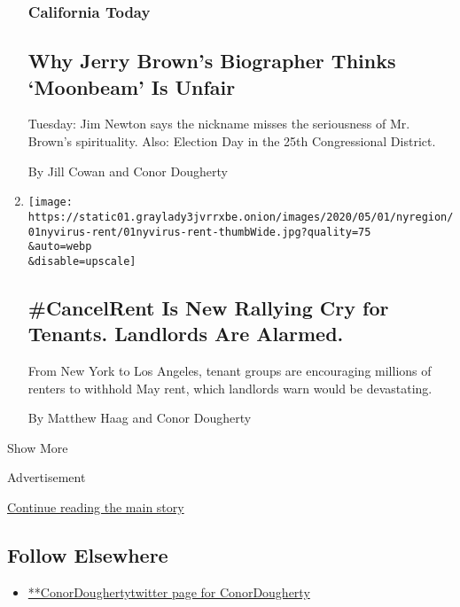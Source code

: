 \begin{enumerate}
  \hypertarget{california-today}{%
  \subsubsection{California Today}\label{california-today}}

  \hypertarget{why-jerry-browns-biographer-thinks-moonbeam-is-unfair}{%
  \subsection{Why Jerry Brown's Biographer Thinks `Moonbeam' Is
  Unfair}\label{why-jerry-browns-biographer-thinks-moonbeam-is-unfair}}

  Tuesday: Jim Newton says the nickname misses the seriousness of Mr.
  Brown's spirituality. Also: Election Day in the 25th Congressional
  District.

  By Jill Cowan and Conor Dougherty
\item
  \href{/2020/05/01/nyregion/rent-strike-coronavirus.html}{}

  \texttt{[image: https://static01.graylady3jvrrxbe.onion/images/2020/05/01/nyregion/01nyvirus-rent/01nyvirus-rent-thumbWide.jpg?quality=75\\\&auto=webp\\\&disable=upscale]}

  \hypertarget{cancelrent-is-new-rallying-cry-for-tenants-landlords-are-alarmed}{%
  \subsection{\#CancelRent Is New Rallying Cry for Tenants. Landlords
  Are
  Alarmed.}\label{cancelrent-is-new-rallying-cry-for-tenants-landlords-are-alarmed}}

  From New York to Los Angeles, tenant groups are encouraging millions
  of renters to withhold May rent, which landlords warn would be
  devastating.

  By Matthew Haag and Conor Dougherty
\end{enumerate}

Show More

Advertisement

\protect\hyperlink{after-mid2}{Continue reading the main story}

\hypertarget{follow-elsewhere}{%
\subsection{Follow Elsewhere}\label{follow-elsewhere}}

\begin{itemize}
\tightlist
\item
  \href{https://twitter.com/ConorDougherty}{**ConorDoughertytwitter page
  for ConorDougherty}
\end{itemize}

